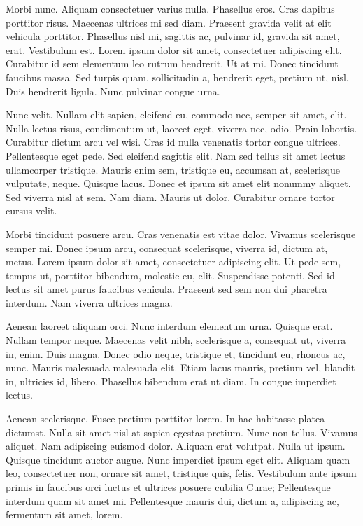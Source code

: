 \documentclass{article}
\begin{document}
Morbi nunc. Aliquam consectetuer varius nulla. Phasellus eros. Cras dapibus
porttitor risus. Maecenas ultrices mi sed diam. Praesent gravida velit at elit
vehicula porttitor. Phasellus nisl mi, sagittis ac, pulvinar id, gravida sit
amet, erat. Vestibulum est. Lorem ipsum dolor sit amet, consectetuer adipiscing
elit. Curabitur id sem elementum leo rutrum hendrerit. Ut at mi. Donec
tincidunt faucibus massa. Sed turpis quam, sollicitudin a, hendrerit eget,
pretium ut, nisl. Duis hendrerit ligula. Nunc pulvinar congue urna.

Nunc velit. Nullam elit sapien, eleifend eu, commodo nec, semper sit amet,
elit. Nulla lectus risus, condimentum ut, laoreet eget, viverra nec, odio.
Proin lobortis. Curabitur dictum arcu vel wisi. Cras id nulla venenatis tortor
congue ultrices. Pellentesque eget pede. Sed eleifend sagittis elit. Nam sed
tellus sit amet lectus ullamcorper tristique. Mauris enim sem, tristique eu,
accumsan at, scelerisque vulputate, neque. Quisque lacus. Donec et ipsum sit
amet elit nonummy aliquet. Sed viverra nisl at sem. Nam diam. Mauris ut dolor.
Curabitur ornare tortor cursus velit.

Morbi tincidunt posuere arcu. Cras venenatis est vitae dolor. Vivamus
scelerisque semper mi. Donec ipsum arcu, consequat scelerisque, viverra id,
dictum at, metus. Lorem ipsum dolor sit amet, consectetuer adipiscing elit. Ut
pede sem, tempus ut, porttitor bibendum, molestie eu, elit. Suspendisse
potenti. Sed id lectus sit amet purus faucibus vehicula. Praesent sed sem non
dui pharetra interdum. Nam viverra ultrices magna.

Aenean laoreet aliquam orci. Nunc interdum elementum urna. Quisque erat.
Nullam tempor neque. Maecenas velit nibh, scelerisque a, consequat ut, viverra
in, enim. Duis magna. Donec odio neque, tristique et, tincidunt eu, rhoncus ac,
nunc. Mauris malesuada malesuada elit. Etiam lacus mauris, pretium vel, blandit
in, ultricies id, libero. Phasellus bibendum erat ut diam. In congue imperdiet
lectus.

Aenean scelerisque. Fusce pretium porttitor lorem. In hac habitasse platea
dictumst. Nulla sit amet nisl at sapien egestas pretium. Nunc non tellus.
Vivamus
aliquet. Nam adipiscing euismod dolor. Aliquam erat volutpat. Nulla ut ipsum.
Quisque tincidunt auctor augue. Nunc imperdiet ipsum eget elit. Aliquam quam
leo, consectetuer non, ornare sit amet, tristique quis, felis. Vestibulum ante
ipsum primis in faucibus orci luctus et ultrices posuere cubilia Curae;
Pellentesque interdum quam sit amet mi. Pellentesque mauris dui, dictum a,
adipiscing ac, fermentum sit amet, lorem.
\end{document}
